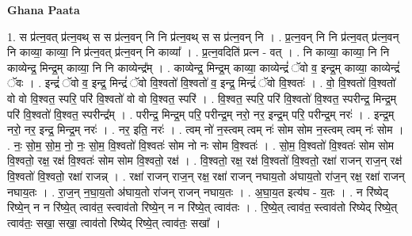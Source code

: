 \documentclass[17pt]{extarticle}
\begin{document}
\textbf{Ghana Paata } \newline

1. स प्र॑त्न॒वत् प्र॑त्न॒वथ् स स प्र॑त्न॒वन् नि नि प्र॑त्न॒वथ् स स प्र॑त्न॒वन् नि । . प्र॒त्न॒वन् नि नि प्र॑त्न॒वत् प्र॑त्न॒वन् नि काव्या॒ काव्या॒ नि प्र॑त्न॒वत् प्र॑त्न॒वन् नि काव्या᳚ । . प्र॒त्न॒वदिति॑ प्रत्न - वत् । . नि काव्या॒ काव्या॒ नि नि काव्येन्द्र॒ मिन्द्र॒म् काव्या॒ नि नि काव्येन्द्र᳚म् । . काव्येन्द्र॒ मिन्द्र॒म् काव्या॒ काव्येन्द्रं॑ ॅवो व॒ इन्द्र॒म् काव्या॒ काव्येन्द्रं॑ ॅवः । . इन्द्रं॑ ॅवो व॒ इन्द्र॒ मिन्द्रं॑ ॅवो वि॒श्वतो॑ वि॒श्वतो॑ व॒ इन्द्र॒ मिन्द्रं॑ ॅवो वि॒श्वतः॑ । . वो॒ वि॒श्वतो॑ वि॒श्वतो॑ वो वो वि॒श्वत॒ स्परि॒ परि॑ वि॒श्वतो॑ वो वो वि॒श्वत॒ स्परि॑ । . वि॒श्वत॒ स्परि॒ परि॑ वि॒श्वतो॑ वि॒श्वत॒ स्परीन्द्र॒ मिन्द्र॒म् परि॑ वि॒श्वतो॑ वि॒श्वत॒ स्परीन्द्र᳚म् । . परीन्द्र॒ मिन्द्र॒म् परि॒ परीन्द्र॒म् नरो॒ नर॒ इन्द्र॒म् परि॒ परीन्द्र॒म् नरः॑ । . इन्द्र॒म् नरो॒ नर॒ इन्द्र॒ मिन्द्र॒म् नरः॑ । . नर॒ इति॒ नरः॑ । . त्वम् नो॑ न॒स्त्वम् त्वम् नः॑ सोम सोम न॒स्त्वम् त्वम् नः॑ सोम । . नः॒ सो॒म॒ सो॒म॒ नो॒ नः॒ सो॒म॒ वि॒श्वतो॑ वि॒श्वतः॑ सोम नो नः सोम वि॒श्वतः॑ । . सो॒म॒ वि॒श्वतो॑ वि॒श्वतः॑ सोम सोम वि॒श्वतो॒ रक्ष॒ रक्ष॑ वि॒श्वतः॑ सोम सोम वि॒श्वतो॒ रक्ष॑ । . वि॒श्वतो॒ रक्ष॒ रक्ष॑ वि॒श्वतो॑ वि॒श्वतो॒ रक्षा॑ राजन् राज॒न् रक्ष॑ वि॒श्वतो॑ वि॒श्वतो॒ रक्षा॑ राजन्न् । . रक्षा॑ राजन् राज॒न् रक्ष॒ रक्षा॑ राजन् नघाय॒तो अ॑घाय॒तो रा॑ज॒न् रक्ष॒ रक्षा॑ राजन् नघाय॒तः । . रा॒ज॒न् न॒घा॒य॒तो अ॑घाय॒तो रा॑जन् राजन् नघाय॒तः । . अ॒घा॒य॒त इत्य॑घ - य॒तः । . न रि॑ष्येद् रिष्ये॒न् न न रि॑ष्ये॒त् त्वाव॑त॒ स्त्वाव॑तो रिष्ये॒न् न न रि॑ष्ये॒त् त्वाव॑तः । . रि॒ष्ये॒त् त्वाव॑त॒ स्त्वाव॑तो रिष्येद् रिष्ये॒त् त्वाव॑तः॒ सखा॒ सखा॒ त्वाव॑तो रिष्येद् रिष्ये॒त् त्वाव॑तः॒ सखा᳚ । \newline
\end{document}
